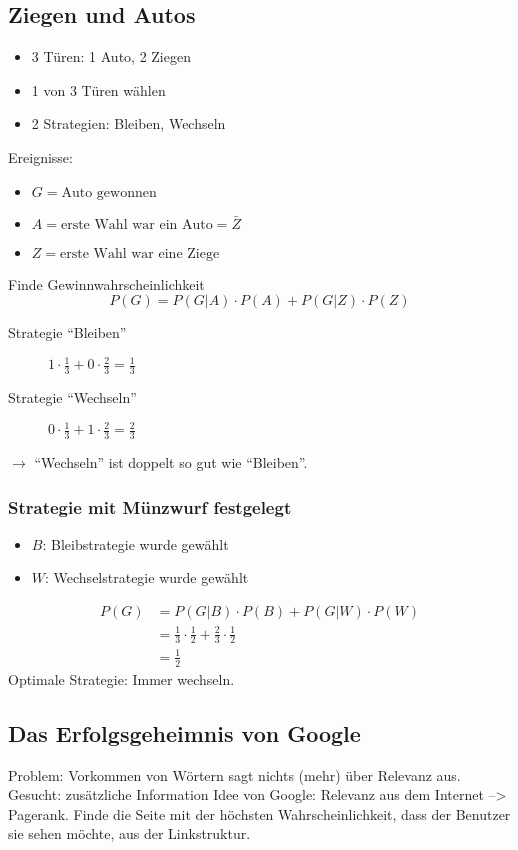 \documentclass[10pt,a4paper]{scrartcl}
\begin{document}
\subsection{Ziegen und Autos}
\begin{itemize}
\item 3 Türen: 1 Auto, 2 Ziegen
\item 1 von 3 Türen wählen
\item 2 Strategien: Bleiben, Wechseln
\end{itemize}

Ereignisse:
\begin{itemize}
\item $G = \mbox{Auto gewonnen}$
\item $A = \mbox{erste Wahl war ein Auto} = \bar{Z}$
\item $Z = \mbox{erste Wahl war eine Ziege}$
\end{itemize}

Finde Gewinnwahrscheinlichkeit
$$P(G) = P(G|A) \cdot P(A) + P(G|Z) \cdot P(Z)$$
\begin{description}
\item[Strategie ``Bleiben''] $1 \cdot \frac{1}{3} + 0 \cdot \frac{2}{3} = \frac{1}{3}$
\item[Strategie ``Wechseln''] $0 \cdot \frac{1}{3} + 1 \cdot \frac{2}{3} = \frac{2}{3}$
\end{description}
$\rightarrow$ ``Wechseln'' ist doppelt so gut wie ``Bleiben''.

\subsubsection{Strategie mit Münzwurf festgelegt}
\begin{itemize}
\item $B$: Bleibstrategie wurde gewählt
\item $W$: Wechselstrategie wurde gewählt
\end{itemize}
\begin{align*}
P(G) & = P(G|B) \cdot P(B) + P(G|W) \cdot P(W) \\
	& = \frac{1}{3}\cdot\frac{1}{2} + \frac{2}{3}\cdot\frac{1}{2} \\
    & = \frac{1}{2}
\end{align*}
Optimale Strategie: Immer wechseln.

\subsection{Das Erfolgsgeheimnis von Google}
Problem: Vorkommen von Wörtern sagt nichts (mehr) über Relevanz aus.
Gesucht: zusätzliche Information
Idee von Google: Relevanz aus dem Internet --> Pagerank. Finde die Seite mit der höchsten Wahrscheinlichkeit, dass der Benutzer sie sehen möchte, aus der Linkstruktur.
\end{document}
